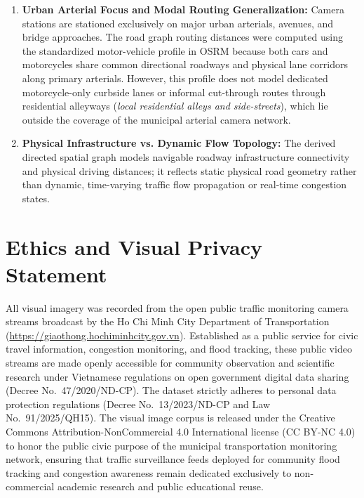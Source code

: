 \documentclass[preprint,12pt]{elsarticle}
\begin{document}
\begin{enumerate}
    \item \textbf{Urban Arterial Focus and Modal Routing Generalization:} Camera stations are stationed exclusively on major urban arterials, avenues, and bridge approaches. The road graph routing distances were computed using the standardized motor-vehicle profile in OSRM because both cars and motorcycles share common directional roadways and physical lane corridors along primary arterials. However, this profile does not model dedicated motorcycle-only curbside lanes or informal cut-through routes through residential alleyways (\textit{local residential alleys and side-streets}), which lie outside the coverage of the municipal arterial camera network.
    \item \textbf{Physical Infrastructure vs. Dynamic Flow Topology:} The derived directed spatial graph models navigable roadway infrastructure connectivity and physical driving distances; it reflects static physical road geometry rather than dynamic, time-varying traffic flow propagation or real-time congestion states.
\end{enumerate}

\section{Ethics and Visual Privacy Statement}
All visual imagery was recorded from the open public traffic monitoring camera streams broadcast by the Ho Chi Minh City Department of Transportation (\url{https://giaothong.hochiminhcity.gov.vn}). Established as a public service for civic travel information, congestion monitoring, and flood tracking, these public video streams are made openly accessible for community observation and scientific research under Vietnamese regulations on open government digital data sharing (Decree No.~47/2020/ND-CP). The dataset strictly adheres to personal data protection regulations (Decree No.~13/2023/ND-CP and Law No.~91/2025/QH15). The visual image corpus is released under the Creative Commons Attribution-NonCommercial 4.0 International license (CC BY-NC 4.0) to honor the public civic purpose of the municipal transportation monitoring network, ensuring that traffic surveillance feeds deployed for community flood tracking and congestion awareness remain dedicated exclusively to non-commercial academic research and public educational reuse.
\end{document}

